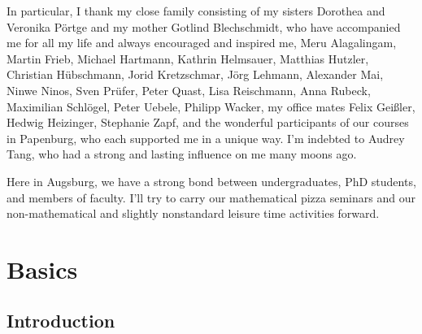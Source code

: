 \documentclass[10pt,reqno,a4paper]{amsbook}
\theoremstyle{definition}
\theoremstyle{plain}
\theoremstyle{remark}
\newcommand{\?}{\,{:}\,}
\renewcommand{\_}{\mathpunct{.}\,}
\begin{document}
{In particular, I thank my close family consisting of my sisters Dorothea and
Veronika Pörtge and my mother Gotlind Blechschmidt, who have accompanied me for
all my life and always encouraged and inspired me, Meru Alagalingam, Martin Frieb,
Michael Hartmann, Kathrin Helmsauer, Matthias Hutzler,
Christian Hübschmann, Jorid Kretzschmar, Jörg Lehmann, Alex\-an\-der Mai, Ninwe
Ninos, Sven Prüfer, Peter Quast, Lisa Reisch\-mann, Anna Rubeck, Ma\-xi\-mi\-li\-an
Schlögel, Peter Uebele, Philipp Wacker, my office mates Felix Geißler, Hedwig Heizinger,
Stephanie Zapf, and the wonderful participants of our courses in Papenburg, who
each supported me in a unique way. I'm indebted to Audrey Tang, who had a
strong and lasting influence on me many moons ago.

Here in Augsburg, we have a strong bond between undergraduates, PhD students,
and members of faculty. I'll try to carry our mathematical pizza seminars and
our non-mathematical and slightly nonstandard leisure time activities forward.

}


\setcounter{tocdepth}{1}
\tableofcontents


\chapter{Basics}

\section{Introduction}
\end{document}
